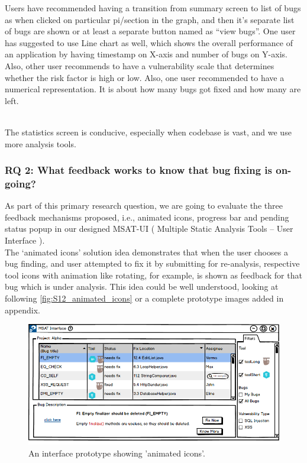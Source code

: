 Users have recommended having a transition from summary screen to list of bugs as when clicked on particular pi/section in the graph, and then it’s separate list of bugs are shown or at least a separate button named as “view bugs”. One user has suggested to use Line chart as well, which shows the overall performance of an application by having timestamp on X-axis and number of bugs on Y-axis. Also, other user recommends to have a vulnerability scale that determines whether the risk factor is high or low. Also, one user recommended to have a numerical representation. It is about how many bugs got fixed and how many are left. \\ \\

\begin{myboxi}
	The statistics screen is conducive, especially when codebase is vast, and we use more analysis tools.
\end{myboxi}
\hfill \break
\subsubsection{RQ 2: What feedback works to know that bug fixing is on-going?}

As part of this primary research question, we are going to evaluate the three feedback mechanisms proposed, i.e., animated icons, progress bar and pending status popup in our designed MSAT-UI ( Multiple Static Analysis Tools – User Interface ). \\

The ‘animated icons’ solution idea demonstrates that when the user chooses a bug finding, and user attempted to fix it by submitting for re-analysis,  respective tool icons with animation like rotating, for example, is shown as feedback for that bug which is under analysis. This idea could be well understood, looking at following \autoref{fig:S12_animated_icons} or a complete prototype images added in appendix. \\

\begin{figure}[hbt!]
	\centering
	\includegraphics[width=\linewidth]{figures/solution_ideas_snaps/S12_animated_icons}
	\caption{An interface prototype showing 'animated icons'.}
	\label{fig:S12_animated_icons}
\end{figure}

